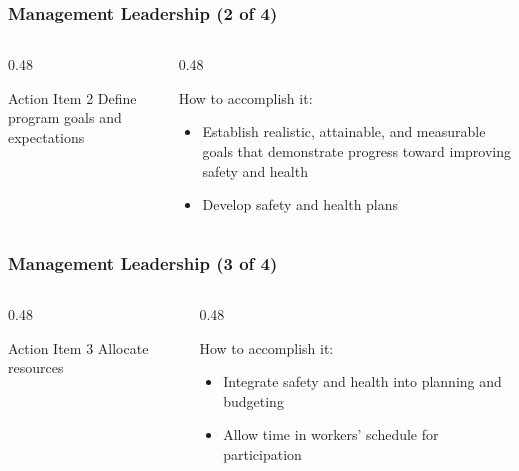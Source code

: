 \begin{frame}
    \frametitle{Management Leadership (2 of 4)}
    \begin{columns}[t]
        \begin{column}{0.48\linewidth}
            \begin{block}{Action Item 2}
                Define program goals and expectations
            \end{block}
        \end{column}
        \begin{column}{0.48\linewidth}
            \begin{block}{How to accomplish it:}
                \begin{itemize}[<+- | alert@+>]
                    \item Establish realistic, attainable, and measurable goals that demonstrate progress toward improving safety and health
                    \item Develop safety and health plans
                \end{itemize}
            \end{block}
        \end{column}
    \end{columns}
\end{frame}

\begin{frame}
    \frametitle{Management Leadership (3 of 4)}
    \begin{columns}[t]
        \begin{column}{0.48\linewidth}
            \begin{block}{Action Item 3}
                Allocate resources
            \end{block}
        \end{column}
        \begin{column}{0.48\linewidth}
            \begin{block}{How to accomplish it:}
                \begin{itemize}[<+- | alert@+>]
                    \item Integrate safety and health into planning and budgeting
                    \item Allow time in workers' schedule for participation
                \end{itemize}
            \end{block}
        \end{column}
    \end{columns}
\end{frame}


